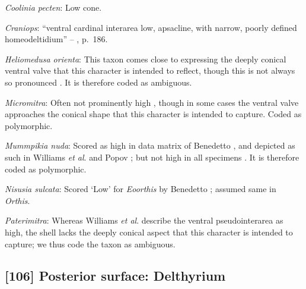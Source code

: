 \documentclass[openany]{book}
\theoremstyle{definition}
\theoremstyle{definition}
\theoremstyle{definition}
\theoremstyle{remark}
\begin{document}
\hypertarget{Coolinia_pecten-coding-105}{}
\emph{Coolinia pecten}: Low cone.

\hypertarget{Craniops-coding-105}{}
\emph{Craniops}: ``ventral cardinal interarea low, apsacline, with
narrow, poorly defined homeodeltidium'' --
\citet{Williams2000LinguliformeaCraniiformea}, p.~186.

\hypertarget{Heliomedusa_orienta-coding-105}{}
\emph{Heliomedusa orienta}: This taxon \citetext{\citealp[see][fig.
129]{Williams2000LinguliformeaCraniiformea}; \citealp[fig.
1]{Popov1992TheCambrian}} comes close to expressing the deeply conical
ventral valve that this character is intended to reflect, though this is
not always so pronounced \citep[e.g.][fig.
125]{Williams2000LinguliformeaCraniiformea}. It is therefore coded as
ambiguous.

\hypertarget{Micromitra-coding-105}{}
\emph{Micromitra}: Often not prominently high
\citep{Skovsted2003EarlyCambrian, Balthasar2004Shellstructure}, though
in some cases \citep[e.g.][]{Butler2015Exceptionallypreserved} the
ventral valve approaches the conical shape that this character is
intended to capture. Coded as polymorphic.

\hypertarget{Mummpikia_nuda-coding-105}{}
\emph{Mummpikia nuda}: Scored as high in data matrix of Benedetto
\citeyearpar{Benedetto2009iChaniella}, and depicted as such in Williams
\emph{et al}. \citeyearpar[fig.
125]{Williams2000LinguliformeaCraniiformea} and Popov \citeyearpar[fig.
1]{Popov1992TheCambrian}; but not high in all specimens
\citep[e.g.][fig. 126]{Williams2000LinguliformeaCraniiformea}. It is
therefore coded as polymorphic.

\hypertarget{Nisusia_sulcata-coding-105}{}
\emph{Nisusia sulcata}: Scored `Low' for \emph{Eoorthis} by Benedetto
\citeyearpar{Benedetto2009iChaniella}; assumed same in \emph{Orthis}.

\hypertarget{Paterimitra-coding-105}{}
\emph{Paterimitra}: Whereas Williams \emph{et al}.
\citeyearpar[p.~156]{Williams2000LinguliformeaCraniiformea} describe the
ventral pseudointerarea as high, the shell lacks the deeply conical
aspect that this character is intended to capture; we thus code the
taxon as ambiguous.

\subsection*{{[}106{]} Posterior surface:
Delthyrium}\label{posterior-surface-delthyrium}
\end{document}
